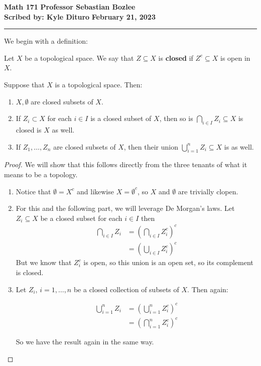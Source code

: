 \documentclass[12pt, twosided]{article}
\begin{document}
\noindent \textbf{Math 171} \hfill \textbf{Professor Sebastian Bozlee} \\
\textbf{Scribed by: Kyle Dituro} \hfill \textbf{February 21, 2023}\hrule
\vspace{.2in}

We begin with a definition:

\begin{df}
  Let \(X\) be a topological space. We say that \(Z \subseteq X\) is \textbf{closed} if \(Z^c \subseteq X\) is open in \(X\).
\end{df}

\begin{prop}
  Suppose that \(X\) is a topological space. Then:
  \begin{enumerate}
  \item \(X, \emptyset\) are closed subsets of \(X\).
  \item If \(Z_i \subset X\) for each \(i \in I\) is a closed subset of \(X\), then so is \(\bigcap_{i \in I}Z_i \subseteq X\) is closed is \(X\) as well.
  \item If \(Z_1, \ldots, Z_n\) are closed subsets of \(X\), then their union \(\bigcup_{i = 1}^nZ_i \subseteq X\) is as well.
  \end{enumerate}
\end{prop}
\begin{proof}
  We will show that this follows directly from the three tenants of what it means to be a topology.
  \begin{enumerate}
  \item Notice that \(\emptyset = X^c\) and likewise \(X = \emptyset^c\), so \(X\) and \(\emptyset\) are trivially clopen.
  \item For this and the following part, we will leverage De Morgan's laws. Let \(Z_i \subseteq X\) be a closed subset for each \(i \in I\) then
    \begin{align*}
      \bigcap_{i\in I}Z_i &= \left(\bigcap_{i \in I}Z_i^c\right)^c \\
                          &= \left(\bigcup_{i \in I} Z_{i}^c \right)^c
    \end{align*}
    But we know that \(Z_i^c\) is open, so this union is an open set, so its complement is closed.
  \item Let \(Z_i\), \(i = 1, \ldots, n\) be a closed collection of subsets of \(X\). Then again:

    \begin{align*}
      \bigcup_{i=1}^n Z_{i} &= \left(\bigcup_{i=1}^nZ_i^c\right)^c \\
                            &=\left(\bigcap_{i=1}^nZ_i^c \right)^c
    \end{align*}

    So we have the result again in the same way.
  \end{enumerate}
\end{proof}
\end{document}
